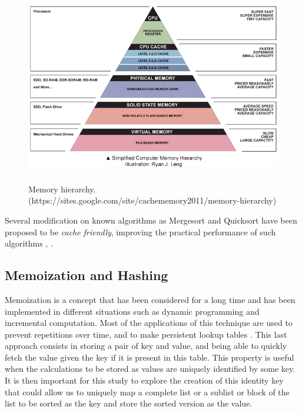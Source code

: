 \documentclass[a4paper,12pt]{article}
\begin{document}
\begin{figure}[H]
\centering
\includegraphics[height=8.55cm,keepaspectratio]{./images/ComputerMemoryHierarchy.png}
\caption{Memory hierarchy. (https://sites.google.com/site/cachememory2011/memory-hierarchy)}
\label{fig:Memory}
\end{figure}

Several modification on known algorithms as Mergesort and Quicksort have been proposed to be {\it cache friendly}, improving the practical performance of such algorithms \cite{lamarca1999influence},  \cite{xiao2000improving}.


\subsection{Memoization and Hashing} \label{memoHash}

Memoization is a concept that has been considered for a long time and has been implemented in different situations \cite{acar2003selective} such as dynamic programming and incremental computation. Most of the applications of this technique are used to prevent repetitions over time, and to make persistent lookup tables \cite{hall1997improving}. This last approach consists in storing a pair of key and value, and being able to quickly fetch the value given the key if it is present in this table. This property is useful when the calculations to be stored as values are uniquely identified by some key. \\

It is then important for this study to explore the creation of this identity key that could allow us to uniquely map a complete list or a sublist or block of the list to be sorted as the key and store the sorted version as the value. \\
\end{document}
